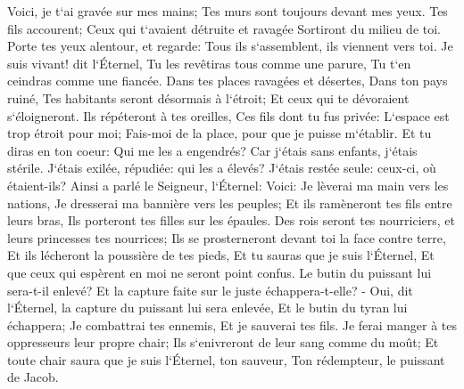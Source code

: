 \verse Voici, je t`ai gravée sur mes mains; Tes murs sont toujours devant mes yeux. 
\verse Tes fils accourent; Ceux qui t`avaient détruite et ravagée Sortiront du milieu de toi. 
\verse Porte tes yeux alentour, et regarde: Tous ils s`assemblent, ils viennent vers toi. Je suis vivant! dit l`Éternel, Tu les revêtiras tous comme une parure, Tu t`en ceindras comme une fiancée. 
\verse Dans tes places ravagées et désertes, Dans ton pays ruiné, Tes habitants seront désormais à l`étroit; Et ceux qui te dévoraient s`éloigneront. 
\verse Ils répéteront à tes oreilles, Ces fils dont tu fus privée: L`espace est trop étroit pour moi; Fais-moi de la place, pour que je puisse m`établir. 
\verse Et tu diras en ton coeur: Qui me les a engendrés? Car j`étais sans enfants, j`étais stérile. J`étais exilée, répudiée: qui les a élevés? J`étais restée seule: ceux-ci, où étaient-ils? 
\verse Ainsi a parlé le Seigneur, l`Éternel: Voici: Je lèverai ma main vers les nations, Je dresserai ma bannière vers les peuples; Et ils ramèneront tes fils entre leurs bras, Ils porteront tes filles sur les épaules. 
\verse Des rois seront tes nourriciers, et leurs princesses tes nourrices; Ils se prosterneront devant toi la face contre terre, Et ils lécheront la poussière de tes pieds, Et tu sauras que je suis l`Éternel, Et que ceux qui espèrent en moi ne seront point confus. 
\verse Le butin du puissant lui sera-t-il enlevé? Et la capture faite sur le juste échappera-t-elle? - 
\verse Oui, dit l`Éternel, la capture du puissant lui sera enlevée, Et le butin du tyran lui échappera; Je combattrai tes ennemis, Et je sauverai tes fils. 
\verse Je ferai manger à tes oppresseurs leur propre chair; Ils s`enivreront de leur sang comme du moût; Et toute chair saura que je suis l`Éternel, ton sauveur, Ton rédempteur, le puissant de Jacob. 

